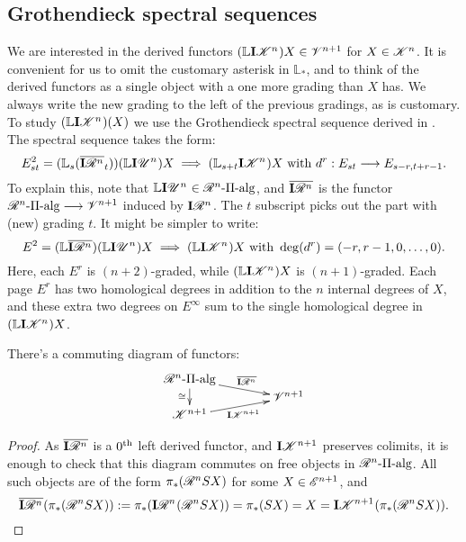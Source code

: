 \documentclass[11pt]{article}
\newcommand{\GS}[1]{\scrE^{#1}}
\newcommand{\PRLie}[1]{\scrR^{#1}}%
\newcommand{\LL}[1]{{\scrK}^{#1}}%
\newcommand{\GR}[1]{\scrV^{#1}}%
\newcommand{\nontop}[1]{\scrU^{#1}}%
\newcommand{\PiAlg}[1]{#1\textup{-$\Pi$-alg}}
\newcommand{\Ind}[2][]{\mathbf{I}{#2}_{#1}}%
\newcommand{\Fr}[1]{#1}%
\newcommand{\derived}{\mathbb{L}}
\begin{document}
\begin{GrothendieckSpectralSequences}
\section*{Grothendieck spectral sequences}
We are interested in the derived functors $(\derived\Ind{\LL{n}})X\in\GR{n+1}$ for $X\in\LL{n}$. It is convenient for us to omit the customary asterisk in $\derived_*$, and to think of the derived functors as a single object with a one more grading than $X$ has. We always write the new grading to the left of the previous gradings, as is customary. To study $(\derived\Ind{\LL{n}})(X)$ we use the Grothendieck spectral sequence derived in \cite{Blanc_Stover-Groth_SS.pdf}. The spectral sequence takes the form:
\[E^2_{st}=(\derived_s(\overline{\Ind{\PRLie{n}}}_t))(\derived\Ind{\nontop{n}})X\implies(\derived_{s+t}\Ind{\LL{n}})X\textup{ with }d^{r}:E_{st}\to E_{s-r,t+r-1}.\]
To explain this, note that $\derived\Ind{\nontop{n}}\in\PiAlg{\PRLie{n}}$, and $\overline{\Ind{\PRLie{n}}}$ is the functor $\PiAlg{\PRLie{n}}\to\GR{n+1}$ induced by $\Ind{\PRLie{n}}$. The $t$ subscript picks out the part with (new) grading $t$. It might be simpler to write:
\[E^2=(\derived\overline{\Ind{\PRLie{n}}})(\derived\Ind{\nontop{n}})X\implies(\derived\Ind{\LL{n}})X\textup{ with }\deg(d^r)=(-r,r-1,0,\ldots,0).\]
Here, each $E^r$ is $(n+2)$-graded, while $(\derived\Ind{\LL{n}})X$ is $(n+1)$-graded. Each page $E^r$ has two homological degrees in addition to the $n$ internal degrees of $X$, and these extra two degrees on $E^\infty$ sum to the single homological degree in $(\derived\Ind{\LL{n}})X$.
\begin{prop*}
There's a commuting diagram of functors:
\[\xymatrix@R=0mm@C=14mm{
\PiAlg{\PRLie{n}}
\ar[dr]^-{\overline{\Ind{\PRLie{n}}}}
\ar[dd]_-{\cong}
&%
\\%
&%
\GR{n+1}\\%
\LL{n+1}
\ar[ur]_-{\Ind{\LL{n+1}}}
&%
}\]
\end{prop*}
\begin{proof}
As $\overline{\Ind{\PRLie{n}}}$ is a $0^\textup{th}$ left derived functor, and $\Ind{\LL{n+1}}$ preserves colimits, it is enough to check that this diagram commutes on free objects in $\PiAlg{\PRLie{n}}$. All such objects are of the form $\pi_*(\Fr{\PRLie{n}}SX)$ for some $X\in\GS{n+1}$, and
\[\overline{\Ind{\PRLie{n}}}(\pi_*(\Fr{\PRLie{n}}SX)):=\pi_*(\Ind{\PRLie{n}}(\Fr{\PRLie{n}}SX))=\pi_*(SX)=X=\Ind{\LL{n+1}}(\pi_*(\Fr{\PRLie{n}}SX)).\qedhere\]

\end{proof}
\end{GrothendieckSpectralSequences}
\end{document}
